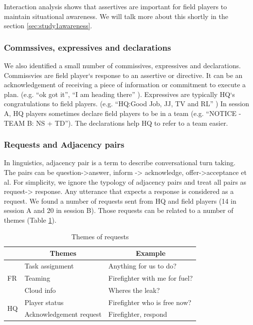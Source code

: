 Interaction analysis shows that assertives are important for field players to maintain situational awareness. We will talk more about this shortly in the section \ref{sec:study1awareness}.\\

\subsubsection{Commssives, expressives and declarations}
We also identified a small number of commissives, expressives and declarations. Commissvies are field player`s response to an assertive or directive. It can be an acknowledgement of receiving a piece of information or commitment to execute a plan. (e.g. ``ok got it'', ``I am heading there'' ). Expressives are typically HQ`s congratulations to field players. (e.g. ``HQ:Good Job, JJ, TV and RL'' ) In session A, HQ players sometimes declare field players to be in a team (e.g. ``NOTICE - TEAM B: NS + TD''). The declarations help HQ to refer to a team easier.\\

\subsubsection{Requests and Adjacency pairs}\label{sec:adjpairs}
In linguistics, adjacency pair is a term to describe conversational turn taking. The pairs can be question->answer, inform -> acknowledge, offer->acceptance et al. For simplicity, we ignore the typology of adjacency pairs and treat all pairs as request-> response. Any utterance that expects a response is considered as a request. We found a number of requests sent from HQ and field players (14 in session A and 20 in session B). Those requests can be related to a number of themes (Table \ref{tab:requestThemes}).\\

\begin{table}[h]
\footnotesize
\begin{tabular}{l|ll}
                    & \multicolumn{1}{c}{Themes} & \multicolumn{1}{c}{Example}   \\ \hline
\multirow{3}{*}{FR} & Task assignment            & Anything for us to do?        \\
                    & Teaming                    & Firefighter with me for fuel? \\
                    & Cloud info                 & Wheres the leak?              \\ \hline
\multirow{2}{*}{HQ} & Player status              & Firefighter who is free now?  \\
                    & Acknowledgement request    & Firefighter, respond         
\end{tabular}
\caption{Themes of requests}
\label{tab:requestThemes}
\end{table}

